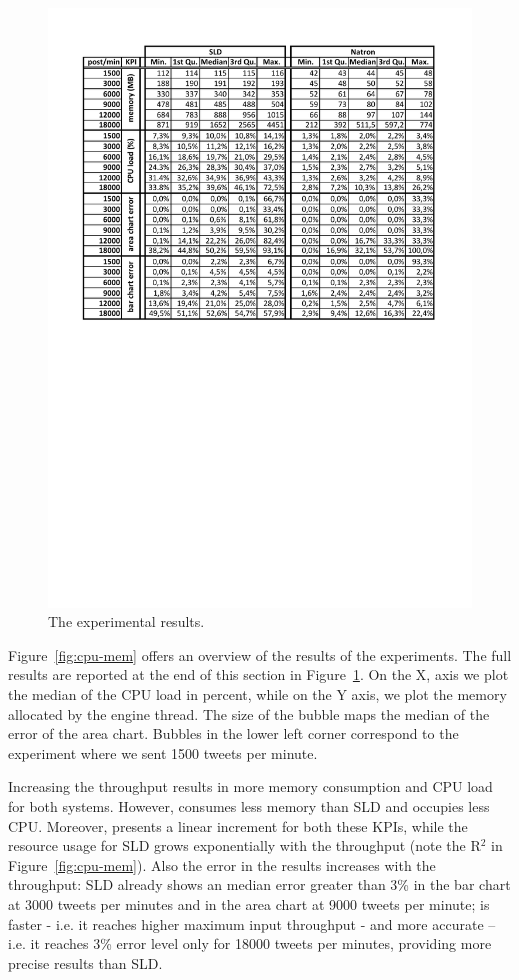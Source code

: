 {\begin{figure}[t]
\centering
\includegraphics[width=\textwidth]{img/comp-mod-results}
\caption{The experimental results.}
\label{fig:all-data}
\end{figure}

Figure~\ref{fig:cpu-mem} offers an overview of the results of the experiments. The full results are reported at the end of this section in Figure~\ref{fig:all-data}. On the X, axis we plot the median of the CPU load in percent, while on the Y axis, we plot the memory allocated by the engine thread. The size of the bubble maps the median of the error of the area chart. Bubbles in the lower left corner correspond to the experiment where we sent 1500 tweets per minute.

Increasing the throughput results in more memory consumption and CPU load for both systems. However, \sti{} consumes less memory than SLD and occupies less CPU. Moreover, \sti{} presents a linear increment for both these KPIs, while the resource usage for SLD grows exponentially with the throughput (note the R$^2$ in Figure~\ref{fig:cpu-mem}). Also the error in the results increases with the throughput: SLD already shows an median error greater than 3\% in the bar chart at 3000 tweets per minutes and in the area chart at 9000 tweets per minute; \sti{} is faster - i.e. it reaches higher maximum input throughput - and more accurate -- i.e. it reaches 3\% error level only for 18000 tweets per minutes, providing more precise results than SLD.

}

